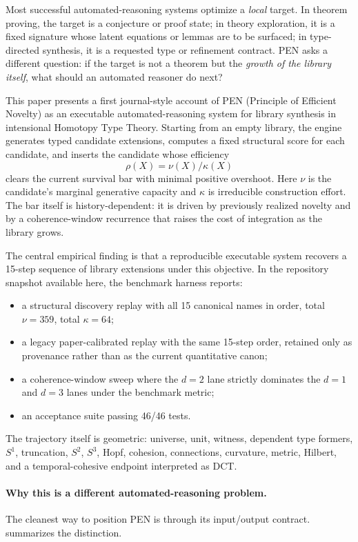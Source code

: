 \documentclass[11pt,a4paper]{article}
\begin{document}
Most successful automated-reasoning systems optimize a \emph{local} target. In theorem proving, the target is a conjecture or proof state; in theory exploration, it is a fixed signature whose latent equations or lemmas are to be surfaced; in type-directed synthesis, it is a requested type or refinement contract. PEN asks a different question: if the target is not a theorem but the \emph{growth of the library itself}, what should an automated reasoner do next?

This paper presents a first journal-style account of PEN (Principle of Efficient Novelty) as an executable automated-reasoning system for library synthesis in intensional Homotopy Type Theory. Starting from an empty library, the engine generates typed candidate extensions, computes a fixed structural score for each candidate, and inserts the candidate whose efficiency
\[
\rho(X)=\nu(X)/\kappa(X)
\]
clears the current survival bar with minimal positive overshoot. Here $\nu$ is the candidate's marginal generative capacity and $\kappa$ is irreducible construction effort. The bar itself is history-dependent: it is driven by previously realized novelty and by a coherence-window recurrence that raises the cost of integration as the library grows.

The central empirical finding is that a reproducible executable system recovers a 15-step sequence of library extensions under this objective. In the repository snapshot available here, the benchmark harness reports:
\begin{itemize}[nosep]
  \item a structural discovery replay with all 15 canonical names in order, total $\nu=359$, total $\kappa=64$;
  \item a legacy paper-calibrated replay with the same 15-step order, retained only as provenance rather than as the current quantitative canon;
  \item a coherence-window sweep where the $d=2$ lane strictly dominates the $d=1$ and $d=3$ lanes under the benchmark metric;
  \item an acceptance suite passing 46/46 tests.
\end{itemize}
The trajectory itself is geometric: universe, unit, witness, dependent type formers, $S^1$, truncation, $S^2$, $S^3$, Hopf, cohesion, connections, curvature, metric, Hilbert, and a temporal-cohesive endpoint interpreted as DCT.

\paragraph{Why this is a different automated-reasoning problem.}
The cleanest way to position PEN is through its input/output contract.  summarizes the distinction.
\end{document}
